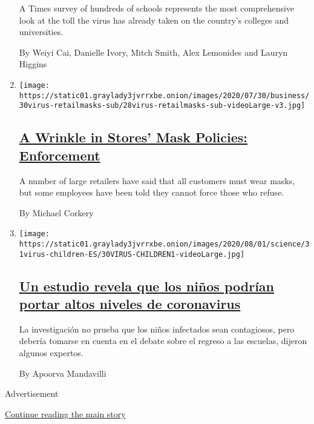\begin{enumerate}
  A Times survey of hundreds of schools represents the most
  comprehensive look at the toll the virus has already taken on the
  country's colleges and universities.

  By Weiyi Cai, Danielle Ivory, Mitch Smith, Alex Lemonides and Lauryn
  Higgins
\item
  \texttt{[image: https://static01.graylady3jvrrxbe.onion/images/2020/07/30/business/30virus-retailmasks-sub/28virus-retailmasks-sub-videoLarge-v3.jpg]}

  \hypertarget{a-wrinkle-in-stores-mask-policies-enforcement}{%
  \subsection{\texorpdfstring{\href{/2020/07/29/business/coronavirus-masks-stores-walmart.html}{A
  Wrinkle in Stores' Mask Policies:
  Enforcement}}{A Wrinkle in Stores' Mask Policies: Enforcement}}\label{a-wrinkle-in-stores-mask-policies-enforcement}}

  A number of large retailers have said that all customers must wear
  masks, but some employees have been told they cannot force those who
  refuse.

  By Michael Corkery
\item
  \texttt{[image: https://static01.graylady3jvrrxbe.onion/images/2020/08/01/science/31virus-children-ES/30VIRUS-CHILDREN1-videoLarge.jpg]}

  \hypertarget{un-estudio-revela-que-los-niuxf1os-podruxedan-portar-altos-niveles-de-coronavirus}{%
  \subsection{\texorpdfstring{\href{/es/2020/07/31/espanol/ciencia-y-tecnologia/ninos-contagio-coronavirus.html}{Un
  estudio revela que los niños podrían portar altos niveles de
  coronavirus}}{Un estudio revela que los niños podrían portar altos niveles de coronavirus}}\label{un-estudio-revela-que-los-niuxf1os-podruxedan-portar-altos-niveles-de-coronavirus}}

  La investigación no prueba que los niños infectados sean contagiosos,
  pero debería tomarse en cuenta en el debate sobre el regreso a las
  escuelas, dijeron algunos expertos.

  By Apoorva Mandavilli
\end{enumerate}

Advertisement

\protect\hyperlink{after-mid2}{Continue reading the main story}

